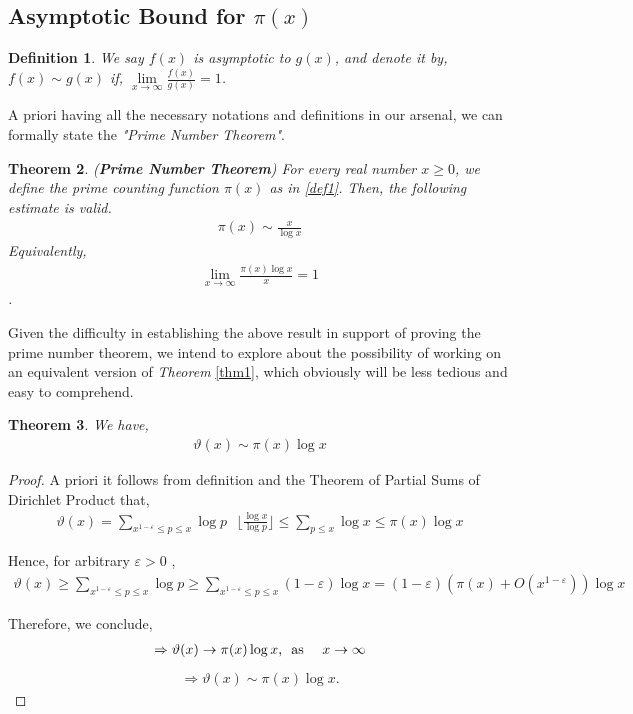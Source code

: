 \documentclass[article,12pt]{elsarticle}
\newtheorem{thm}{Theorem}[section]
\newtheorem{dfn}[thm]{Definition}
\begin{document}
	\subsection{Asymptotic Bound for $\pi(x)$}
	\begin{dfn}\label{def6}
		We say $f(x)$ is \textit{asymptotic} to $g(x)$, and denote it by, $f(x) \sim g(x)$ if, \space\space  $\lim\limits_{x\to\infty}\frac{f(x)}{g(x)}= 1$.
	\end{dfn} 
	A priori having all the necessary notations and definitions in our arsenal, we can formally state the \textit{"Prime Number Theorem"}.
	\begin{thm}\label{thm1}
		(\textbf{Prime Number Theorem})  For every real number $x\geq 0$, we define the \textit{prime counting function} $\pi(x)$ as in \eqref{def1}. Then, the following estimate is valid.  
		\begin{align}
			\pi(x) \sim \frac{x}{\log x} 
		\end{align}
		Equivalently, 
		\begin{align}
			\lim\limits_{x\to\infty}\frac{\pi(x)\log x}{x} = 1 
		\end{align} . 
	\end{thm} 
	Given the difficulty in establishing the above result in support of proving the prime number theorem, we intend to explore about the possibility of working on an equivalent version of \textit{Theorem} \eqref{thm1}, which obviously will be less tedious and easy to comprehend.
	\begin{thm}\label{thm2}
		We have,
		\begin{align}
			\vartheta(x) \sim \pi(x)\log x 
		\end{align}
	\end{thm}
	\begin{proof}
		A priori it follows from definition and the Theorem of Partial Sums of Dirichlet Product that,
		\begin{align}
			\vartheta(x) = \sum\limits_{x^{1-\varepsilon}\leq p\leq x} \log p\mbox{ }\lfloor\frac{\log x}{\log p}\rfloor \leq \sum\limits_{p\leq x} \log x \leq \pi(x)\log x 
		\end{align}
		
		
		Hence, for arbitrary $ \varepsilon>0 $ ,
		\begin{align*}
			\vartheta(x)\geq \sum\limits_{x^{1-\varepsilon}\leq p\leq x} \log p \geq \sum\limits_{x^{1-\varepsilon}\leq p\leq x} (1-\varepsilon)\log x = (1-\varepsilon)(\pi(x) +O(x^{1- \varepsilon}))\log x  
		\end{align*}
		
		Therefore, we conclude, 
		\begin{align}
			\Rightarrow \vartheta(x) \rightarrow \pi(x)\log x \mbox{, \space  as \hspace{10pt}}  x \rightarrow \infty 
		\end{align}
		\begin{align}
			\Rightarrow \vartheta(x) \sim \pi(x)\log x  .
		\end{align}
	\end{proof}
\end{document}
